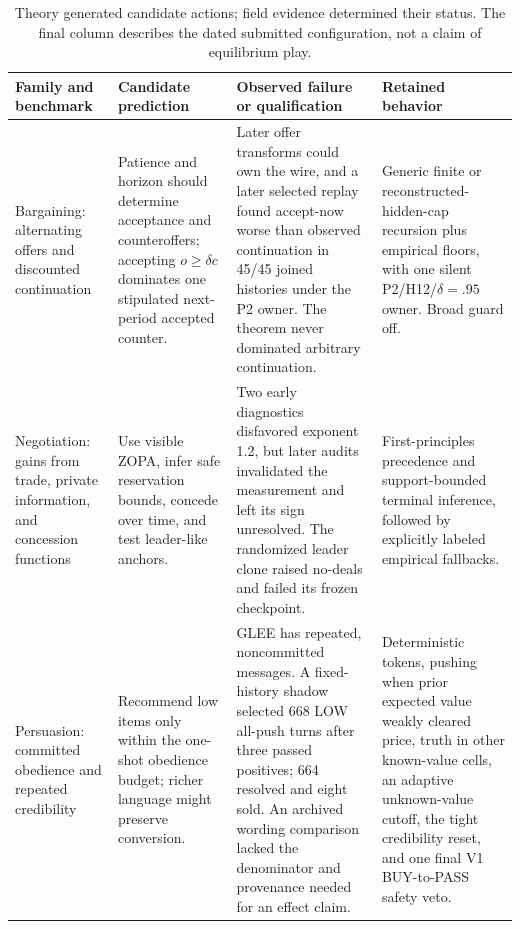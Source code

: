 \begin{table}[h]
\centering
\small
\caption{Theory generated candidate actions; field evidence determined their
status. The final column describes the dated submitted configuration, not a
claim of equilibrium play.}
\label{tab:theory_evolution}
\begin{tabularx}{\linewidth}{@{}p{2.4cm}p{3.5cm}p{4.3cm}Y@{}}
\toprule
Family and benchmark & Candidate prediction & Observed failure or qualification & Retained behavior \\
\midrule
Bargaining: alternating offers and discounted continuation \citep{rubinstein1982} & Patience and horizon should determine acceptance and counteroffers; accepting $o\geq\delta c$ dominates one stipulated next-period accepted counter. & Later offer transforms could own the wire, and a later selected replay found accept-now worse than observed continuation in 45/45 joined histories under the P2 owner. The theorem never dominated arbitrary continuation. & Generic finite or reconstructed-hidden-cap recursion plus empirical floors, with one silent P2/H12/$\delta=.95$ owner. Broad guard off. \\
Negotiation: gains from trade, private information, and concession functions \citep{chatterjee1983incomplete,faratin1998negotiation} & Use visible ZOPA, infer safe reservation bounds, concede over time, and test leader-like anchors. & Two early diagnostics disfavored exponent 1.2, but later audits invalidated the measurement and left its sign unresolved. The randomized leader clone raised no-deals and failed its frozen checkpoint. & First-principles precedence and support-bounded terminal inference, followed by explicitly labeled empirical fallbacks. \\
Persuasion: committed obedience and repeated credibility \citep{kamenica2011bayesian,sobel1985credibility} & Recommend low items only within the one-shot obedience budget; richer language might preserve conversion. & GLEE has repeated, noncommitted messages. A fixed-history shadow selected 668 LOW all-push turns after three passed positives; 664 resolved and eight sold. An archived wording comparison lacked the denominator and provenance needed for an effect claim. & Deterministic tokens, pushing when prior expected value weakly cleared price, truth in other known-value cells, an adaptive unknown-value cutoff, the tight credibility reset, and one final V1 BUY-to-PASS safety veto. \\
\bottomrule
\end{tabularx}
\end{table}

